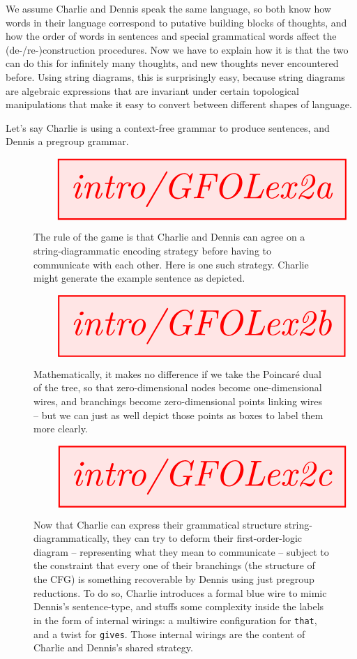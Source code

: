We assume Charlie and Dennis speak the same language, so both know how words in their language correspond to putative building blocks of thoughts, and how the order of words in sentences and special grammatical words affect the (de-/re-)construction procedures. Now we have to explain how it is that the two can do this for infinitely many thoughts, and new thoughts never encountered before. Using string diagrams, this is surprisingly easy, because string diagrams are algebraic expressions that are invariant under certain topological manipulations that make it easy to convert between different shapes of language.

\begin{example} Let's say Charlie is using a context-free grammar to produce sentences, and Dennis a pregroup grammar. \\

\begin{figure}[h!]\label{fig:GFOLex2a}
\centering
\[\resizebox{\textwidth}{!}{\tikzfig{intro/GFOLex2a}}\]
\caption{The rule of the game is that Charlie and Dennis can agree on a string-diagrammatic encoding strategy before having to communicate with each other. Here is one such strategy. Charlie might generate the example sentence as depicted.}
\end{figure}

\begin{figure}[h!]\label{fig:GFOLex2b}
\centering
\[\resizebox{\textwidth}{!}{\tikzfig{intro/GFOLex2b}}\]
\caption{Mathematically, it makes no difference if we take the Poincar\'{e} dual of the tree, so that zero-dimensional nodes become one-dimensional wires, and branchings become zero-dimensional points linking wires -- but we can just as well depict those points as boxes to label them more clearly.}
\end{figure}

\begin{figure}[h!]\label{fig:GFOLex2c}
\centering
\[\resizebox{\textwidth}{!}{\tikzfig{intro/GFOLex2c}}\]
\caption{Now that Charlie can express their grammatical structure string-diagrammatically, they can try to deform their first-order-logic diagram -- representing what they mean to communicate -- subject to the constraint that every one of their branchings (the structure of the CFG) is something recoverable by Dennis using just pregroup reductions. To do so, Charlie introduces a formal blue wire to mimic Dennis's sentence-type, and stuffs some complexity inside the labels in the form of internal wirings: a multiwire configuration for \texttt{that}, and a twist for \texttt{gives}. Those internal wirings are the content of Charlie and Dennis's shared strategy.}
\end{figure}


\end{example}
